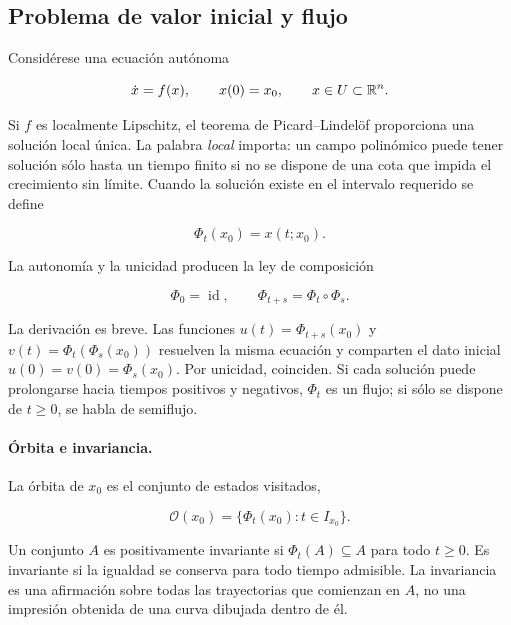 \subsection{Problema de valor inicial y flujo}

Considérese una ecuación autónoma

\begin{equation}
 \dot x=f(x),\qquad x(0)=x_0,\qquad x\in U\subset\mathbb{R}^n.
 \label{eq:gt-pvi}
\end{equation}

Si $f$ es localmente Lipschitz, el teorema de Picard--Lindelöf proporciona una
solución local única. La palabra \emph{local} importa: un campo polinómico puede
tener solución sólo hasta un tiempo finito si no se dispone de una cota que impida
el crecimiento sin límite. Cuando la solución existe en el intervalo requerido se
define

\begin{equation}
 \Phi_t(x_0)=x(t;x_0).
 \label{eq:gt-flujo-def}
\end{equation}

La autonomía y la unicidad producen la ley de composición

\begin{equation}
 \Phi_0=\operatorname{id},\qquad
 \Phi_{t+s}=\Phi_t\circ\Phi_s.
 \label{eq:gt-ley-flujo}
\end{equation}

La derivación es breve. Las funciones $u(t)=\Phi_{t+s}(x_0)$ y
$v(t)=\Phi_t(\Phi_s(x_0))$ resuelven la misma ecuación y comparten el dato inicial
$u(0)=v(0)=\Phi_s(x_0)$. Por unicidad, coinciden. Si cada solución puede prolongarse
hacia tiempos positivos y negativos, $\Phi_t$ es un flujo; si sólo se dispone de
$t\geq0$, se habla de semiflujo.

\paragraph{Órbita e invariancia.}
La órbita de $x_0$ es el conjunto de estados visitados,

\begin{equation}
 \mathcal O(x_0)=\{\Phi_t(x_0):t\in I_{x_0}\}.
 \label{eq:gt-orbita}
\end{equation}

Un conjunto $A$ es positivamente invariante si $\Phi_t(A)\subseteq A$ para todo
$t\geq0$. Es invariante si la igualdad se conserva para todo tiempo admisible. La
invariancia es una afirmación sobre todas las trayectorias que comienzan en $A$, no
una impresión obtenida de una curva dibujada dentro de él.

